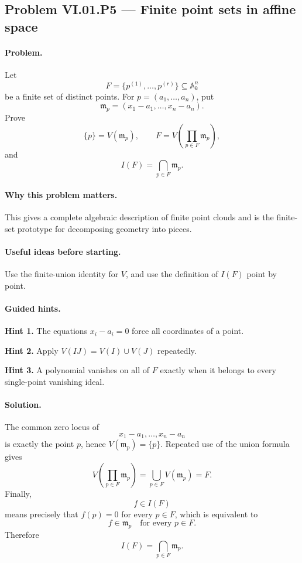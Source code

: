\subsection*{Problem VI.01.P5 --- Finite point sets in affine space}
\label{prob:vi01-p5}

\paragraph{Problem.}
Let
\[
F=\{p^{(1)},\dots,p^{(r)}\}\subseteq\mathbb A_k^n
\]
be a finite set of distinct points.  For
\(p=(a_1,\dots,a_n)\), put
\[
\mathfrak m_p=(x_1-a_1,\dots,x_n-a_n).
\]
Prove
\[
\{p\}=V(\mathfrak m_p),
\qquad
F=V\!\left(\prod_{p\in F}\mathfrak m_p\right),
\]
and
\[
I(F)=\bigcap_{p\in F}\mathfrak m_p.
\]

\ifdefined\FullProblemDossiers
\paragraph{Why this problem matters.}
This gives a complete algebraic description of finite point clouds and is the finite-set
prototype for decomposing geometry into pieces.

\paragraph{Useful ideas before starting.}
Use the finite-union identity for \(V\), and use the definition of \(I(F)\) point by point.

\paragraph{Guided hints.}
\textbf{Hint 1.} The equations \(x_i-a_i=0\) force all coordinates of a point.

\textbf{Hint 2.} Apply \(V(IJ)=V(I)\cup V(J)\) repeatedly.

\textbf{Hint 3.} A polynomial vanishes on all of \(F\) exactly when it belongs to every
single-point vanishing ideal.

\paragraph{Solution.}
The common zero locus of
\[
x_1-a_1,\dots,x_n-a_n
\]
is exactly the point \(p\), hence \(V(\mathfrak m_p)=\{p\}\).  Repeated use of the union
formula gives
\[
V\!\left(\prod_{p\in F}\mathfrak m_p\right)
=\bigcup_{p\in F}V(\mathfrak m_p)
=F.
\]
Finally,
\[
f\in I(F)
\]
means precisely that \(f(p)=0\) for every \(p\in F\), which is equivalent to
\[
f\in\mathfrak m_p\quad\text{for every }p\in F.
\]
Therefore
\[
I(F)=\bigcap_{p\in F}\mathfrak m_p.
\]


